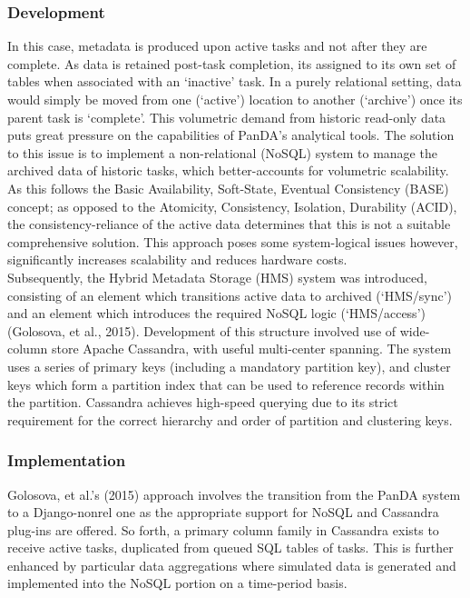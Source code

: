 \documentclass[11pt, english]{article}
\begin{document}
		\subsubsection{Development}

	In this case, metadata is produced upon active tasks and not after they are complete. As data is retained post-task completion, its assigned to its own set of tables when associated with an `inactive' task. In a purely relational setting, data would simply be moved from one (`active') location to another (`archive') once its parent task is `complete'. This volumetric demand from historic read-only data puts great pressure on the capabilities of PanDA's analytical tools. The solution to this issue is to implement a non-relational (NoSQL) system to manage the archived data of historic tasks, which better-accounts for volumetric scalability. As this follows the Basic Availability, Soft-State, Eventual Consistency (BASE) concept; as opposed to the Atomicity, Consistency, Isolation, Durability (ACID),	the consistency-reliance of the active data determines that this is not a suitable comprehensive solution. This approach poses some system-logical issues however, significantly increases scalability and reduces hardware costs.\\

	Subsequently, the Hybrid Metadata Storage (HMS) system was introduced, consisting of an element which transitions active data to archived (`HMS/sync') and an element which introduces the required NoSQL logic (`HMS/access') (Golosova, et al., 2015). Development of this structure involved use of wide-column store Apache Cassandra, with useful multi-center spanning. The system uses a series of primary keys (including a mandatory partition key), and cluster keys which form a partition index that can be used to reference records within the partition. Cassandra achieves high-speed querying due to its strict requirement for the correct hierarchy and order of partition and clustering keys.

		\subsubsection{Implementation}

	Golosova, et al.'s (2015) approach involves the transition from the PanDA system to a Django-nonrel one as the appropriate support for NoSQL and Cassandra plug-ins are offered. So forth, a primary column family in Cassandra exists to receive active tasks, duplicated from queued SQL tables of tasks. This is further enhanced by particular data aggregations where simulated data is generated and implemented into the NoSQL portion on a time-period basis.\\
\end{document}
